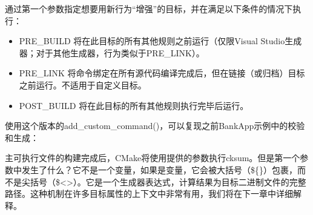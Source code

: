 通过第一个参数指定想要用新行为“增强”的目标，并在满足以下条件的情况下执行：

\begin{itemize}
\item
PRE\_BUILD 将在此目标的所有其他规则之前运行（仅限Visual Studio生成器；对于其他生成器，行为类似于PRE\_LINK）。

\item
PRE\_LINK 将命令绑定在所有源代码编译完成后，但在链接（或归档）目标之前运行。不适用于自定义目标。

\item
POST\_BUILD 将在此目标的所有其他规则执行完毕后运行。
\end{itemize}

使用这个版本的add\_custom\_command()，可以复现之前BankApp示例中的校验和生成：



主可执行文件的构建完成后，CMake将使用提供的参数执行cksum。但是第一个参数中发生了什么？它不是一个变量，如果是变量，它会被大括号（\$\{\}）包裹，而不是尖括号（\$<>）。它是一个生成器表达式，计算结果为目标二进制文件的完整路径。这种机制在许多目标属性的上下文中非常有用，我们将在下一章中详细解释。


























